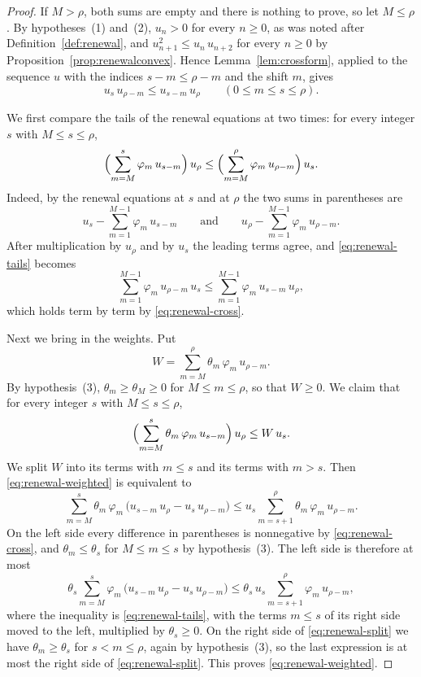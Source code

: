 \documentclass{amsart}
\theoremstyle{definition}
\theoremstyle{remark}
\numberwithin{equation}{section}
\begin{document}
\begin{proof}
If $M>\rho$, both sums are empty and there is nothing to prove, so let
$M\le\rho$. By hypotheses~(1) and~(2), $u_n>0$ for every $n\ge0$, as was
noted after Definition~\ref{def:renewal}, and $u_{n+1}^2\le u_n\,u_{n+2}$ for
every $n\ge0$ by Proposition~\ref{prop:renewalconvex}. Hence
Lemma~\ref{lem:crossform}, applied to the sequence $u$ with the indices
$s-m\le\rho-m$ and the shift $m$, gives
\begin{equation}\label{eq:renewal-cross}
u_s\,u_{\rho-m}\le u_{s-m}\,u_\rho\qquad(0\le m\le s\le\rho).
\end{equation}

We first compare the tails of the renewal equations at two times: for every
integer $s$ with $M\le s\le\rho$,
\begin{equation}\label{eq:renewal-tails}
\Bigl(\sum_{m=M}^{s}\varphi_m\,u_{s-m}\Bigr)\,u_\rho
\le\Bigl(\sum_{m=M}^{\rho}\varphi_m\,u_{\rho-m}\Bigr)\,u_s .
\end{equation}
Indeed, by the renewal equations at $s$ and at $\rho$ the two sums in
parentheses are
\[
u_s-\sum_{m=1}^{M-1}\varphi_m\,u_{s-m}
\qquad\text{and}\qquad
u_\rho-\sum_{m=1}^{M-1}\varphi_m\,u_{\rho-m} .
\]
After multiplication by $u_\rho$ and by $u_s$ the leading terms agree,
and \eqref{eq:renewal-tails} becomes
\[
\sum_{m=1}^{M-1}\varphi_m\,u_{\rho-m}\,u_s
\le\sum_{m=1}^{M-1}\varphi_m\,u_{s-m}\,u_\rho ,
\]
which holds term by term by \eqref{eq:renewal-cross}.

Next we bring in the weights. Put
\[
W=\sum_{m=M}^{\rho}\theta_m\,\varphi_m\,u_{\rho-m} .
\]
By hypothesis~(3), $\theta_m\ge\theta_M\ge0$ for $M\le m\le\rho$, so that
$W\ge0$. We claim that for every integer $s$ with $M\le s\le\rho$,
\begin{equation}\label{eq:renewal-weighted}
\Bigl(\sum_{m=M}^{s}\theta_m\,\varphi_m\,u_{s-m}\Bigr)\,u_\rho\le W\,u_s .
\end{equation}
We split $W$ into its terms with $m\le s$ and its terms with $m>s$. Then
\eqref{eq:renewal-weighted} is equivalent to
\begin{equation}\label{eq:renewal-split}
\sum_{m=M}^{s}\theta_m\,\varphi_m\,
\bigl(u_{s-m}\,u_\rho-u_s\,u_{\rho-m}\bigr)
\le u_s\sum_{m=s+1}^{\rho}\theta_m\,\varphi_m\,u_{\rho-m} .
\end{equation}
On the left side every difference in parentheses is nonnegative by
\eqref{eq:renewal-cross}, and $\theta_m\le\theta_s$ for $M\le m\le s$ by
hypothesis~(3). The left side is therefore at most
\[
\theta_s\sum_{m=M}^{s}\varphi_m\,
\bigl(u_{s-m}\,u_\rho-u_s\,u_{\rho-m}\bigr)
\le\theta_s\,u_s\sum_{m=s+1}^{\rho}\varphi_m\,u_{\rho-m} ,
\]
where the inequality is \eqref{eq:renewal-tails}, with the terms $m\le s$ of
its right side moved to the left, multiplied by $\theta_s\ge0$. On the right
side of \eqref{eq:renewal-split} we have $\theta_m\ge\theta_s$ for
$s<m\le\rho$, again by hypothesis~(3), so the last expression is at most the
right side of \eqref{eq:renewal-split}. This proves
\eqref{eq:renewal-weighted}.


\end{proof}
\end{document}
